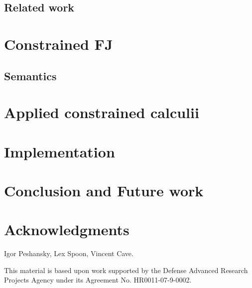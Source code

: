 \documentclass[nocopyrightspace,preprint,9pt]{sigplanconf}
\begin{document}
\subsection{Related work}\label{sec:related}


\section{Constrained FJ}\label{sec:lang}



\subsection{Semantics}
\label{sec:semantics}


\section{Applied constrained calculii}\label{sec:examples}


\section{Implementation}\label{sec:implementation}


\section{Conclusion and Future work}\label{sec:future}\label{sec:conclusions}



\section*{Acknowledgments}

Igor Peshansky,
Lex Spoon,
Vincent Cave.

This material is based upon work supported by the Defense
Advanced Research Projects Agency under its Agreement No.
HR0011-07-9-0002.




\balance


% 
\end{document}
